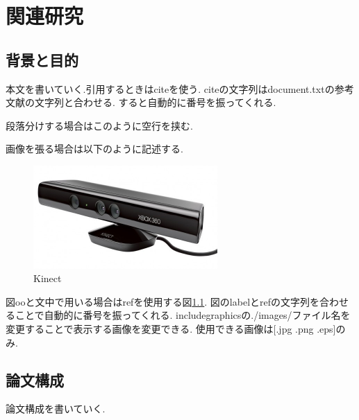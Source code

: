 \chapter{関連研究}\label{2nd.tex}
\section{背景と目的}
本文を書いていく.引用するときはciteを使う\cite{cite_1}.
citeの文字列はdocument.txtの参考文献の文字列と合わせる.
すると自動的に番号を振ってくれる.

段落分けする場合はこのように空行を挟む.

画像を張る場合は以下のように記述する.

\begin{figure}[htbp]
  \begin{center}
    \includegraphics[clip,width=7.0cm]{./images/Kinect.jpg}
    \caption{Kinect}
    \label{fig:Kinect}
  \end{center}
\end{figure}

図ooと文中で用いる場合はrefを使用する図\ref{fig:Kinect}.
図のlabelとrefの文字列を合わせることで自動的に番号を振ってくれる.
includegraphicsの./images/ファイル名を変更することで表示する画像を変更できる.
使用できる画像は[.jpg .png .eps]のみ.

\section{論文構成}
論文構成を書いていく.
